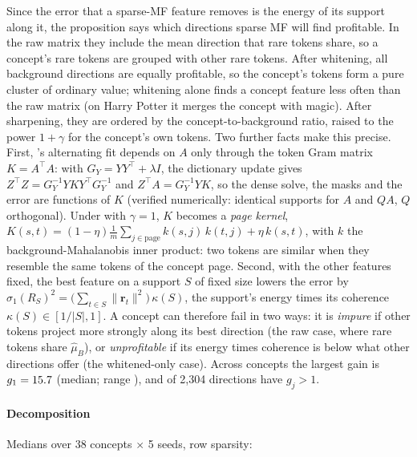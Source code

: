 Since the error that a sparse-MF feature removes is the energy of its support along it, the proposition says which directions sparse MF will find profitable.
In the raw matrix they include the mean direction that rare tokens share, so a concept's rare tokens are grouped with other rare tokens.
After whitening, all background directions are equally profitable, so the concept's tokens form a pure cluster of ordinary value; whitening alone finds a concept feature less often than the raw matrix (on Harry Potter it merges the concept with magic).
After sharpening, they are ordered by the concept-to-background ratio, raised to the power $1+\gamma$ for the concept's own tokens.
Two further facts make this precise.
First, \ember{}'s alternating fit depends on $A$ only through the token Gram matrix $K = A^{\top}A$: with $G_Y = YY^{\top}+\lambda I$, the dictionary update gives $Z^{\top}Z = G_Y^{-1}YKY^{\top}G_Y^{-1}$ and $Z^{\top}A = G_Y^{-1}YK$, so the dense solve, the masks and the error are functions of $K$ (verified numerically: identical supports for $A$ and $QA$, $Q$ orthogonal).
Under \cs{} with $\gamma = 1$, $K$ becomes a \emph{page kernel}, $K(s,t) = (1-\eta)\frac{1}{m}\sum_{j\in\text{page}} k(s,j)\,k(t,j) + \eta\,k(s,t)$, with $k$ the background-Mahalanobis inner product: two tokens are similar when they resemble the same tokens of the concept page.
Second, with the other features fixed, the best feature on a support $S$ of fixed size lowers the error by $\sigma_1(R_S)^2 = \big(\sum_{t\in S}\|\mathbf r_t\|^2\big)\,\kappa(S)$, the support's energy times its coherence $\kappa(S) \in [1/|S|, 1]$.
A concept can therefore fail in two ways: it is \emph{impure} if other tokens project more strongly along its best direction (the raw case, where rare tokens share $\hat\mu_B$), or \emph{unprofitable} if its energy times coherence is below what other directions offer (the whitened-only case).
Across concepts the largest gain is $g_1 = 15.7$ (median; range ), and  of 2{,}304 directions have $g_j > 1$.

\paragraph{Decomposition}
Medians over 38 concepts $\times$ 5 seeds, row sparsity:

